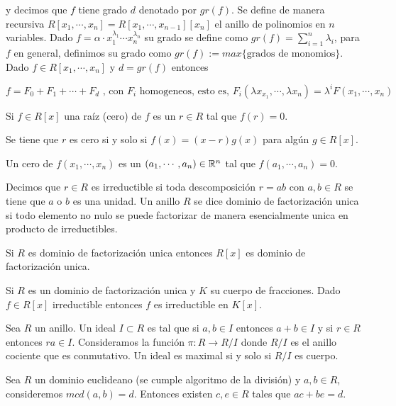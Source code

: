 \documentclass{article}
\begin{document}
\noindent y decimos que $f$ tiene grado $d$ denotado por $gr(f)$. Se define de manera recursiva
$R[x_{1},\cdots,x_{n}]=R[x_{1},\cdots,x_{n-1}][x_{n}]$ el anillo de polinomios en $n$ variables.
Dado $f=\alpha\cdot x_{1}^{\lambda_{1}}\cdots x_{n}^{\lambda_{n}}$ su grado se define como 
$gr(f)=\sum_{i=1}^{n}\lambda_{i}$, para $f$ en general, definimos su grado como 
$gr(f):=max\{\text{grados de monomios}\}$. Dado $f\in R[x_{1},\cdots,x_{n}]$ y $d=gr(f)$ entonces

\begin{equation*}
    f=F_{0}+F_{1}+\cdots+F_{d}\text{ , con }F_{i}\text{ homogeneos, esto es, }
    F_{i}(\lambda x_{x_{1}},\cdots,\lambda x_{n})=\lambda^{i}F(x_{1},\cdots,x_{n})
\end{equation*}

\noindent Si $f\in R[x]$ una raíz (cero) de $f$ es un $r\in R$ tal que $f(r)=0$.

\begin{teo}
    Se tiene que $r$ es cero si y solo si $f(x)=(x-r)g(x)$ para algún $g\in R[x]$.
\end{teo}

\noindent Un cero de $f(x_{1},\cdots,x_{n})$ es un $(a_{1},\cdots,a_{n})\in\mathbb{R}^{n}$ tal que 
$f(a_{1},\cdots,a_{n})=0$.
\vspace{4mm}

\noindent Decimos que $r\in R$ es irreductible si toda descomposición $r=ab$ con $a,b\in R$ se 
tiene que $a$ o $b$ es una unidad. Un anillo $R$ se dice dominio de factorización unica si todo 
elemento no nulo se puede factorizar de manera esencialmente unica en producto de irreductibles.

\begin{lema}
    Si $R$ es dominio de factorización unica entonces $R[x]$ es dominio de factorización unica.
\end{lema}

\begin{lema}
    Si $R$ es un dominio de factorización unica y $K$ su cuerpo de fracciones. 
Dado $f\in R[x]$ irreductible entonces $f$ es irreductible en $K[x]$.
\end{lema}

\noindent Sea $R$ un anillo. Un ideal $I\subset R$ es tal que si $a,b\in I$ entonces $a+b\in I$ y
si $r\in R$ entonces $ra\in I$. Consideramos la función $\pi:R\to R/I$ donde $R/I$ es el anillo 
cociente que es conmutativo. Un ideal es maximal si y solo si $R/I$ es cuerpo.

\begin{teo}
    Sea $R$ un dominio euclideano (se cumple algoritmo de la división) y $a,b\in R$, consideremos
    $mcd(a,b)=d$. Entonces existen $c,e\in R$ tales que $ac+be=d$.
\end{teo}
\end{document}
